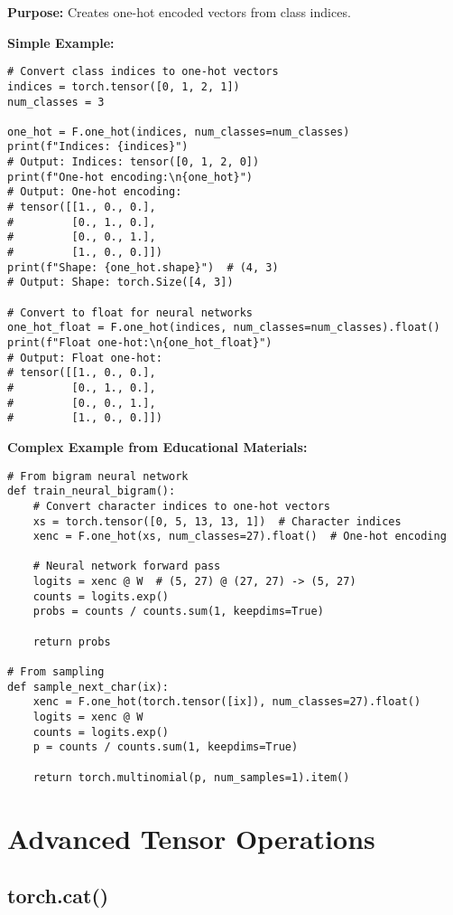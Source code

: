\documentclass[11pt,a4paper]{book}
\begin{document}
\textbf{Purpose:} Creates one-hot encoded vectors from class indices.

\textbf{Simple Example:}
\begin{verbatim}
# Convert class indices to one-hot vectors
indices = torch.tensor([0, 1, 2, 1])
num_classes = 3

one_hot = F.one_hot(indices, num_classes=num_classes)
print(f"Indices: {indices}")
# Output: Indices: tensor([0, 1, 2, 0])
print(f"One-hot encoding:\n{one_hot}")
# Output: One-hot encoding:
# tensor([[1., 0., 0.],
#         [0., 1., 0.],
#         [0., 0., 1.],
#         [1., 0., 0.]])
print(f"Shape: {one_hot.shape}")  # (4, 3)
# Output: Shape: torch.Size([4, 3])

# Convert to float for neural networks
one_hot_float = F.one_hot(indices, num_classes=num_classes).float()
print(f"Float one-hot:\n{one_hot_float}")
# Output: Float one-hot:
# tensor([[1., 0., 0.],
#         [0., 1., 0.],
#         [0., 0., 1.],
#         [1., 0., 0.]])
\end{verbatim}

\textbf{Complex Example from Educational Materials:}
\begin{verbatim}
# From bigram neural network
def train_neural_bigram():
    # Convert character indices to one-hot vectors
    xs = torch.tensor([0, 5, 13, 13, 1])  # Character indices
    xenc = F.one_hot(xs, num_classes=27).float()  # One-hot encoding
    
    # Neural network forward pass
    logits = xenc @ W  # (5, 27) @ (27, 27) -> (5, 27)
    counts = logits.exp()
    probs = counts / counts.sum(1, keepdims=True)
    
    return probs

# From sampling
def sample_next_char(ix):
    xenc = F.one_hot(torch.tensor([ix]), num_classes=27).float()
    logits = xenc @ W
    counts = logits.exp()
    p = counts / counts.sum(1, keepdims=True)
    
    return torch.multinomial(p, num_samples=1).item()
\end{verbatim}

\section{Advanced Tensor Operations}

\subsection{torch.cat()}
\end{document}
